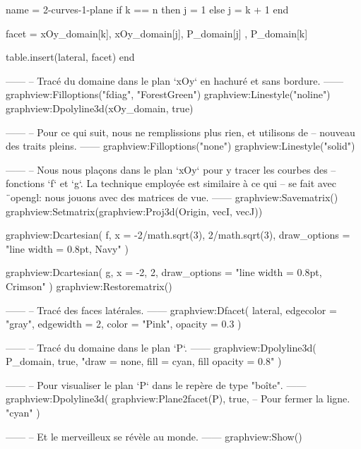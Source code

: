 \documentclass[border = 3pt]{standalone}
\begin{document}
\begin{luadraw}{name = 2-curves-1-plane}
  if k == n then
    j = 1
  else
    j = k + 1
  end

  facet = {
    xOy_domain[k], xOy_domain[j],
    P_domain[j]  , P_domain[k]
  }

  table.insert(lateral, facet)
end

------
-- Tracé du domaine dans le plan `xOy` en hachuré et sans bordure.
------
graphview:Filloptions("fdiag", "ForestGreen")
graphview:Linestyle("noline")
graphview:Dpolyline3d(xOy_domain, true)

------
-- Pour ce qui suit, nous ne remplissions plus rien, et utilisons de
-- nouveau des traits pleins.
------
graphview:Filloptions("none")
graphview:Linestyle("solid")

------
-- Nous nous plaçons dans le plan `xOy` pour y tracer les courbes des
-- fonctions  `f` et `g`. La technique employée est similaire à ce qui
-- se fait avec ¨opengl: nous jouons avec des matrices de vue.
------
graphview:Savematrix()
  graphview:Setmatrix(graphview:Proj3d({Origin, vecI, vecJ}))

  graphview:Dcartesian(
    f,
    {
      x = {-2/math.sqrt(3), 2/math.sqrt(3)},
      draw_options = "line width = 0.8pt, Navy"
    })

  graphview:Dcartesian(
    g,
    {
      x = {-2, 2},
      draw_options = "line width = 0.8pt, Crimson"
    })
graphview:Restorematrix()

------
-- Tracé des faces latérales.
------
graphview:Dfacet(
  lateral,
  {
    edgecolor = "gray",
    edgewidth = 2,
    color   = "Pink",
    opacity   = 0.3
  })

------
-- Tracé du domaine dans le plan `P`.
------
graphview:Dpolyline3d(
  P_domain,
  true,
  "draw = none, fill = cyan, fill opacity = 0.8"
)

------
-- Pour visualiser le plan `P` dans le repère de type "boîte".
------
graphview:Dpolyline3d(
  graphview:Plane2facet(P),
  true,   -- Pour fermer la ligne.
  "cyan"
)

------
-- Et le merveilleux se révèle au monde.
------
graphview:Show()
\end{luadraw}
\end{document}
